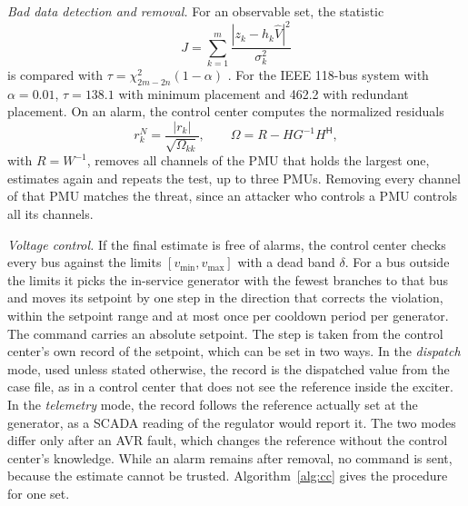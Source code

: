 \documentclass[journal]{IEEEtran}
\begin{document}
\emph{Bad data detection and removal.} For an observable set, the statistic
\begin{equation}
J = \sum_{k=1}^{m} \frac{|z_k - h_k \hat V|^2}{\sigma_k^2}
\label{eq:J}
\end{equation}
is compared with $\tau = \chi^2_{2m-2n}(1-\alpha)$ \cite{abur2004se}. For the IEEE 118-bus system with $\alpha = 0.01$, $\tau = 138.1$ with minimum placement and 462.2 with redundant placement. On an alarm, the control center computes the normalized residuals \cite{handschin1975}
\begin{equation}
r^N_k = \frac{|r_k|}{\sqrt{\Omega_{kk}}}, \qquad \Omega = R - H G^{-1} H^{\mathsf H},
\label{eq:lnr}
\end{equation}
with $R = W^{-1}$, removes all channels of the PMU that holds the largest one, estimates again and repeats the test, up to three PMUs. Removing every channel of that PMU matches the threat, since an attacker who controls a PMU controls all its channels.

\emph{Voltage control.} If the final estimate is free of alarms, the control center checks every bus against the limits $[v_{\min}, v_{\max}]$ with a dead band $\delta$. For a bus outside the limits it picks the in-service generator with the fewest branches to that bus and moves its setpoint by one step in the direction that corrects the violation, within the setpoint range and at most once per cooldown period per generator. The command carries an absolute setpoint. The step is taken from the control center's own record of the setpoint, which can be set in two ways. In the \emph{dispatch} mode, used unless stated otherwise, the record is the dispatched value from the case file, as in a control center that does not see the reference inside the exciter. In the \emph{telemetry} mode, the record follows the reference actually set at the generator, as a SCADA reading of the regulator would report it. The two modes differ only after an AVR fault, which changes the reference without the control center's knowledge. While an alarm remains after removal, no command is sent, because the estimate cannot be trusted. Algorithm~\ref{alg:cc} gives the procedure for one set.
\end{document}
